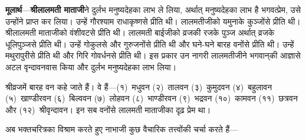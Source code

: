 \begin{sloppypar}\justifying{}
\textbf{मूलार्थ}—\textbf{श्रीलालमती माताजी}ने दुर्लभ मनुष्य\-देहका लाभ ले लिया, अर्थात् मनुष्य\-देहका लाभ है भगवत्प्रेम, उसे उन्होंने प्राप्त कर लिया। उन्हें गौरश्याम राधा\-कृष्णसे प्रीति थी। लालमतीजीको यमुनाके कुञ्जोंसे प्रीति थी। श्रीलालमती माताजीको वंशीवटसे प्रीति थी। लालमती बाईजीको व्रजकी रजके पुञ्ज अर्थात् व्रजके धूलिपुञ्जसे प्रीति थी। उन्हें गोकुलसे और गुरुजनोंसे प्रीति थी और घने-घने बारह वनोंसे प्रीति थी। उन्हें मथुरापुरीसे प्रीति थी और गिरि गोवर्धनसे प्रीति थी। इस प्रकार उन नागरी लालमतीजीने भगवान्‌की आज्ञासे अटल वृन्दावन\-वास किया और दुर्लभ मनुष्य\-देहका लाभ लिया।
\end{sloppypar}
\begin{sloppypar}\justifying{}
श्रीव्रजमें बारह वन कहे जाते हैं। वे हैं—(१)~मधुवन (२)~तालवन (३)~कुमुदवन (४)~बहुलावन (५)~खाण्डीरवन (६)~बिल्ववन (७)~लोहवन (८)~भाण्डीरवन (९)~भद्रवन (१०)~कामवन (११)~छत्रवन और (१२)~श्रीवृन्दावन। इन सब वनोंसे लालमती माताजीका दृढ़ प्रेम था।
\end{sloppypar}
\begin{sloppypar}\justifying{}
अब भक्तचरित्रका विश्राम करते हुए नाभाजी कुछ वैचारिक तत्त्वोंकी चर्चा करते हैं—
\end{sloppypar}


